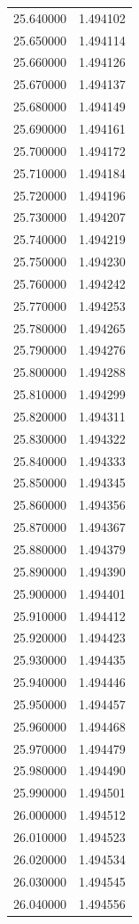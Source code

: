 \begin{tabular}{rr}
25.640000 & 1.494102 \\
25.650000 & 1.494114 \\
25.660000 & 1.494126 \\
25.670000 & 1.494137 \\
25.680000 & 1.494149 \\
25.690000 & 1.494161 \\
25.700000 & 1.494172 \\
25.710000 & 1.494184 \\
25.720000 & 1.494196 \\
25.730000 & 1.494207 \\
25.740000 & 1.494219 \\
25.750000 & 1.494230 \\
25.760000 & 1.494242 \\
25.770000 & 1.494253 \\
25.780000 & 1.494265 \\
25.790000 & 1.494276 \\
25.800000 & 1.494288 \\
25.810000 & 1.494299 \\
25.820000 & 1.494311 \\
25.830000 & 1.494322 \\
25.840000 & 1.494333 \\
25.850000 & 1.494345 \\
25.860000 & 1.494356 \\
25.870000 & 1.494367 \\
25.880000 & 1.494379 \\
25.890000 & 1.494390 \\
25.900000 & 1.494401 \\
25.910000 & 1.494412 \\
25.920000 & 1.494423 \\
25.930000 & 1.494435 \\
25.940000 & 1.494446 \\
25.950000 & 1.494457 \\
25.960000 & 1.494468 \\
25.970000 & 1.494479 \\
25.980000 & 1.494490 \\
25.990000 & 1.494501 \\
26.000000 & 1.494512 \\
26.010000 & 1.494523 \\
26.020000 & 1.494534 \\
26.030000 & 1.494545 \\
26.040000 & 1.494556 \\

\end{tabular}
